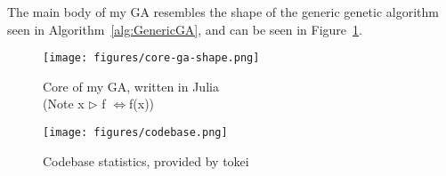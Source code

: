 The main body of my GA resembles the shape of the generic genetic algorithm seen in Algorithm~\ref{alg:GenericGA}, and can be seen in Figure~\ref{fig:core-ga}.


\begin{figure}[ht]
  \centering
  \texttt{[image: figures/core-ga-shape.png]}
  \caption{\label{fig:core-ga} Core of my GA, written in Julia \\ \small (Note x $\rhd$ f $\Leftrightarrow$f(x))}
\end{figure}



\begin{figure}[ht]
  \centering
  \texttt{[image: figures/codebase.png]}
  \caption{\label{fig:codebase} Codebase statistics, provided by tokei}
\end{figure}



